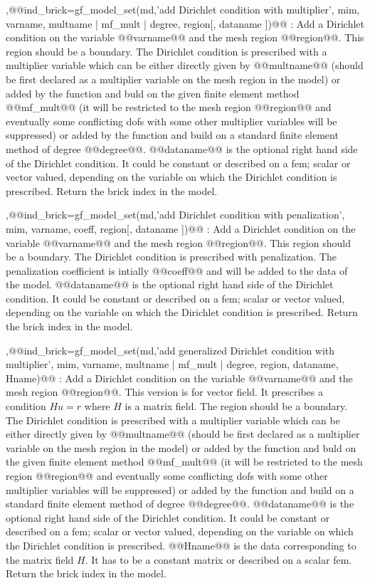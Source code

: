 \begin{cmddescription}
\sep{@@ind_brick=gf_model_set(md,'add Dirichlet condition with multiplier', \tmim mim, \tstr varname, \tstr multname | \tmf mf_mult | \tint degree, \tint region[, \tstr dataname ])@@} :
Add a Dirichlet condition on the variable @@varname@@ and the mesh
region @@region@@. This region should be a boundary. The Dirichlet
condition is prescribed with a multiplier variable which can be either
directly given by @@multname@@ (should be first declared as a multiplier 
variable on the mesh region in the model) or added by the function and
buld on the given finite element method @@mf_mult@@ (it will be restricted to
the mesh region @@region@@ and eventually some conflicting dofs with some
other multiplier variables will be suppressed) or added by the function and
build on a standard finite element method of degree @@degree@@.
@@dataname@@ is the optional
right hand side of  the Dirichlet condition. It could be constant or
described on a fem; scalar or vector valued, depending on the variable
on which the Dirichlet condition is prescribed. Return the brick index
in the model.

\sep{@@ind_brick=gf_model_set(md,'add Dirichlet condition with penalization', \tmim mim, \tstr varname, \tscal coeff, \tint region[, \tstr dataname ])@@} :
Add a Dirichlet condition on the variable @@varname@@ and the mesh
region @@region@@. This region should be a boundary. The Dirichlet
condition is prescribed with penalization. The penalization coefficient
is intially @@coeff@@ and will be added to the data of
the model. @@dataname@@ is the optional
right hand side of  the Dirichlet condition. It could be constant or
described on a fem; scalar or vector valued, depending on the variable
on which the Dirichlet condition is prescribed. Return the brick index
in the model.

\sep{@@ind_brick=gf_model_set(md,'add generalized Dirichlet condition with multiplier', \tmim mim, \tstr varname, \tstr multname | \tmf mf_mult | \tint degree, \tint region, \tstr dataname, \tstr Hname)@@} :
Add a Dirichlet condition on the variable @@varname@@ and the mesh
region @@region@@. This version is for vector field.
It prescribes a condition $Hu = r$
where $H$ is a matrix field. The region should be a boundary. The Dirichlet
condition is prescribed with a multiplier variable which can be either
directly given by @@multname@@ (should be first declared as a multiplier 
variable on the mesh region in the model) or added by the function and
buld on the given finite element method @@mf_mult@@ (it will be restricted to
the mesh region @@region@@ and eventually some conflicting dofs with some
other multiplier variables will be suppressed) or added by the function and
build on a standard finite element method of degree @@degree@@.
@@dataname@@ is the optional
right hand side of  the Dirichlet condition. It could be constant or
described on a fem; scalar or vector valued, depending on the variable
on which the Dirichlet condition is prescribed. @@Hname@@ is the data
    corresponding to the matrix field $H$. It has to be a constant matrix
      or described on a scalar fem. Return the brick index
in the model.


\end{cmddescription}
